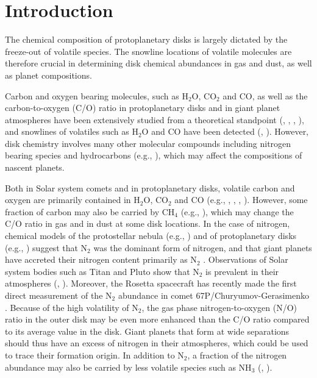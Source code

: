 \documentclass[apj]{emulateapj}
\begin{document}
\section{Introduction}
\label{sec:intro}

The chemical composition of protoplanetary disks is largely dictated by the freeze-out of volatile species. The snowline locations of volatile molecules are therefore crucial in determining disk chemical abundances in gas and dust, as well as planet compositions.  

Carbon and oxygen bearing molecules, such as H$_2$O, CO$_2$ and CO, as well as the carbon-to-oxygen (C/O) ratio in protoplanetary disks and in giant planet atmospheres have been extensively studied from a theoretical standpoint (\citealt{oberg11}, \citealt{alidib14}, \citealt{madhu14}, \citealt{molliere15}), and snowlines of volatiles such as H$_2$O and CO have been detected (\citealt{zhang13}, \citealt{qi13}). However, disk chemistry involves many other molecular compounds \citep{henning13} including nitrogen bearing species and hydrocarbons (e.g., \citealt{mandell12}), which may affect the compositions of nascent planets.

Both in Solar system comets and in protoplanetary disks, volatile carbon and oxygen are primarily contained in H$_2$O, CO$_2$ and CO (e.g., \citealt{lodders03}, \citealt{mumma11}, \citealt{oberg11}, \citealt{boogert15}). However, some fraction of carbon may also be carried by CH$_4$ (e.g., \citealt{oberg08}), which may change the C/O ratio in gas and in dust at some disk locations. In the case of nitrogen, chemical models of the protostellar nebula (e.g., \citealt{owen01}) and of protoplanetary disks (e.g., \citealt{rodgers02}) suggest that N$_2$ was the dominant form of nitrogen, and that giant planets have accreted their nitrogen content primarily as N$_2$ \citep{mousis14}. Observations of Solar system bodies such as Titan and Pluto show that N$_2$ is prevalent in their atmospheres (\citealt{cruikshank93}, \citealt{owen93}).  Moreover, the Rosetta spacecraft has recently made the first direct measurement of the N$_2$ abundance in comet 67P/Churyumov-Gerasimenko \citep{rubin15}. Because of the high volatility of N$_2$, the gas phase nitrogen-to-oxygen (N/O) ratio in the outer disk may be even more enhanced than the C/O ratio compared to its average value in the disk. Giant planets that form at wide separations should thus have an excess of nitrogen in their atmospheres, which could be used to trace their formation origin. In addition to N$_2$, a fraction of the nitrogen abundance may also be carried by less volatile species such as NH$_3$ (\citealt{bottinelli10}, \citealt{mumma11}). 
\end{document}
